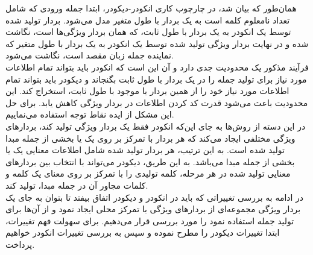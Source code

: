 همان‌طور که بیان شد، در چارچوب کاری انکودر-دیکودر، ابتدا جمله ورودی که شامل تعداد نامعلوم کلمه است به یک بردار با طول متغیر مدل می‌شود. بردار تولید شده توسط یک انکودر به یک بردار با طول ثابت، که همان بردار ویژگی‌ها است، نگاشت شده و در نهایت بردار ویژگی تولید شده توسط یک انکودر به یک بردار با طول متغیر که نماینده جمله زبان مقصد است، نگاشت می‌شود.
\\
فرآیند مذکور یک محدودیت جدی دارد و آن این است که انکودر باید بتواند تمام اطلاعات مورد نیاز برای تولید جمله را در یک بردار با طول ثابت بگنجاند و دیکودر باید بتواند تمام اطلاعات مورد نیاز خود را از همین بردار با موجود با طول ثابت، استخراج کند. این محدودیت باعث می‌شود قدرت کد کردن اطلاعات در بردار ویژگی کاهش یابد. برای حل این مشکل از ایده نقاط توجه استفاده می‌نماییم.
\\
در این دسته از روش‌ها به جای این‌که انکودر فقط یک بردار ویژگی تولید کند، بردارهای ویژگی مختلفی ایجاد می‌کند که هر بردار با تمرکز بر روی یک یا بخشی از جمله مبدا تولید شده است. به این ترتیب، هر بردار تولید شده شامل اطلاعات معنایی یک یا بخشی از جمله مبدا می‌باشد. به این طریق، دیکودر می‌تواند با انتخاب بین بردارهای معنایی تولید شده در هر مرحله، کلمه تولیدی را با تمرکز بر روی معنای یک کلمه و کلمات مجاور آن در جمله مبدا، تولید کند.
\\
در ادامه به بررسی تغییراتی که باید در انکودر و دیکودر اتفاق بیفتد تا بتوان به جای یک بردار ویژگی مجموعه‌ای از بردارهای ویژگی با تمرکز محلی ایجاد نمود و از آن‌ها برای تولید جمله استفاده نمود را مورد بررسی قرار می‌دهیم. برای سهولت فهم تغییرات، ابتدا تغییرات دیکودر را مطرح نموده و سپس به بررسی تغییرات انکودر خواهیم پرداخت.
